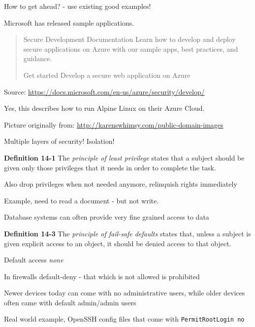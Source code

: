 \documentclass[Screen16to9,17pt]{foils}
\begin{document}

How to get ahead? - use existing good examples!

Microsoft has released sample applications.

\begin{quote}
Secure Development Documentation
Learn how to develop and deploy secure applications on Azure with our sample apps, best practices, and guidance.

Get started
Develop a secure web application on Azure
\end{quote}

Source:
\url{https://docs.microsoft.com/en-us/azure/security/develop/}

Yes, this describes how to run Alpine Linux on their Azure Cloud.



\centerline{Picture originally from: \url{http://karenswhimsy.com/public-domain-images}}




\centerline{\hlkbig\color{security6blue} Multiple layers of security! Isolation!}




\begin{list1}
\item {\bf Definition 14-1} The \emph{principle of least privilege} states that a subject should be given only those privileges that it needs in order to complete the task.
\item Also drop privileges when not needed anymore, relinquish rights immediately
\item Example, need to read a document - but not write.
\item Database systems can often provide very fine grained access to data
\end{list1}



\begin{list1}
\item {\bf Definition 14-3} The \emph{principle of fail-safe defaults} states that, unless a subject is given explicit access to an object, it should be denied access to that object.
\item Default access \emph{none}
\item In firewalls default-deny - that which is not allowed is prohibited
\item Newer devices today can come with no administrative users, while older devices often came with default admin/admin users
\item Real world example, OpenSSH config files that come with \verb+PermitRootLogin no+
\end{list1}
\end{document}

